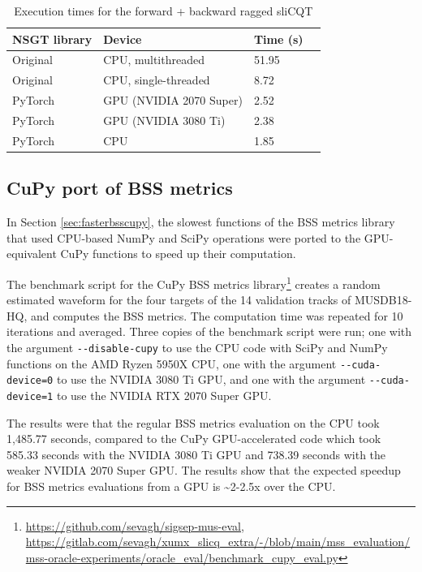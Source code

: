 \documentclass[report.tex]{subfiles}
\begin{document}
\begin{table}[ht]
	\centering
	\caption{Execution times for the forward + backward ragged sliCQT}
	\label{table:nsgttorchresultsragged}
	\begin{tabular}{ |l|l|l|l| }
	 \hline
		NSGT library & Device & Time (s) \\
	 \hline
	 \hline
		Original & CPU, multithreaded & 51.95  \\
	 \hline
		Original & CPU, single-threaded & 8.72  \\
	 \hline
		PyTorch & GPU (NVIDIA 2070 Super) & 2.52 \\
	 \hline
		PyTorch & GPU (NVIDIA 3080 Ti) &  2.38 \\
	 \hline
		PyTorch & CPU & 1.85  \\
	 \hline
\end{tabular}
\end{table}

\subsection{CuPy port of BSS metrics}
\label{sec:gpuexperimentpytorch}

In Section \ref{sec:fasterbsscupy}, the slowest functions of the BSS metrics library that used CPU-based NumPy and SciPy operations were ported to the GPU-equivalent CuPy functions to speed up their computation.

The benchmark script for the CuPy BSS metrics library\footnote{\url{https://github.com/sevagh/sigsep-mus-eval}, \url{https://gitlab.com/sevagh/xumx_slicq_extra/-/blob/main/mss_evaluation/mss-oracle-experiments/oracle_eval/benchmark_cupy_eval.py}} creates a random estimated waveform for the four targets of the 14 validation tracks of MUSDB18-HQ, and computes the BSS metrics. The computation time was repeated for 10 iterations and averaged. Three copies of the benchmark script were run; one with the argument \Verb#--disable-cupy# to use the CPU code with SciPy and NumPy functions on the AMD Ryzen 5950X CPU, one with the argument \Verb#--cuda-device=0# to use the NVIDIA 3080 Ti GPU, and one with the argument \Verb#--cuda-device=1# to use the NVIDIA RTX 2070 Super GPU.

The results were that the regular BSS metrics evaluation on the CPU took 1,485.77 seconds, compared to the CuPy GPU-accelerated code which took 585.33 seconds with the NVIDIA 3080 Ti GPU and 738.39 seconds with the weaker NVIDIA 2070 Super GPU. The results show that the expected speedup for BSS metrics evaluations from a GPU is \textasciitilde 2-2.5x over the CPU.
\end{document}
